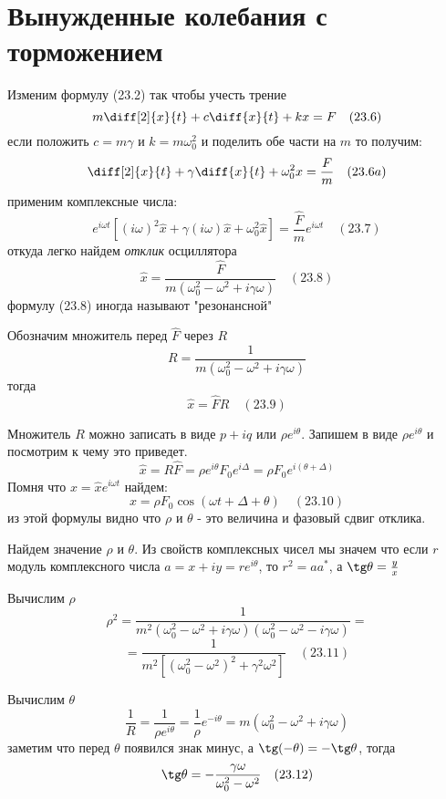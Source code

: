 \documentclass[12pt]{article}
\begin{document}
\newpage

\section{Вынужденные колебания с торможением}

Изменим формулу (23.2) так чтобы учесть трение
\[
    m \diff[2]{x}{t} + c \diff{x}{t} + kx = F \quad (23.6)
\]
если положить $c=m\gamma$ и $k=m\omega_0^2$ и поделить обе части на $m$ то получим:
\[
    \diff[2]{x}{t} + \gamma \diff{x}{t} + \omega_0^2 x = \frac{F}{m} \quad (23.6a)
\]
применим комплексные числа:
\[
    e^{i\omega t}[(i\omega)^2 \hat{x} + \gamma(i\omega)\hat{x} + \omega_0^2 \hat{x}] = \frac{\hat
    F}{m} e^{i\omega t} \quad (23.7)
\]
откуда легко найдем \textit{отклик} осциллятора
\[
    \hat{x}=\frac{\hat{F}}{m(\omega_0^2-\omega^2+i\gamma\omega)} \quad (23.8)    
\]
формулу (23.8) иногда называют "резонансной"

\medskip

Обозначим множитель перед \(\hat{F}\) через \(R\)
\[
    R=\frac{1}{m(\omega_0^2-\omega^2+i\gamma\omega)}
\]
тогда
\[
    \hat{x}=\hat{F}R \quad (23.9) 
\]

\medbreak

Множитель \(R\) можно записать в виде \(p+iq\) или \(\rho e^{i \theta}\). Запишем в виде \(\rho e^{i \theta}\) и посмотрим к чему это приведет.
\[
    \hat{x}=R\hat{F}=\rho e^{i\theta} F_0e^{i \Delta}=\rho F_0e^{i (\theta+\Delta)}
\]
Помня что \(x=\hat{x}e^{i \omega t}\) найдем:
\[
    x=\rho F_0 \cos(\omega t + \Delta + \theta) \quad (23.10)
\]
из этой формулы видно что \(\rho\) и \(\theta\) - это величина и фазовый сдвиг отклика.

\medbreak

Найдем значение \(\rho\) и \(\theta\). Из свойств комплексных чисел мы значем что если \(r\) модуль комплексного числа \(a=x+iy=r e^{i \theta}\), то \(r^2=aa^*\), а \(\tg \theta = \frac{y}{x} \)

Вычислим \(\rho\)
\[
    \rho^2 = \frac{1}{m^2(\omega_0^2-\omega^2+i\gamma\omega)(\omega_0^2-\omega^2-i\gamma\omega)} =
\]
\[
    = \frac{1}{m^2[(\omega_0^2-\omega^2)^2+\gamma^2\omega^2]} \quad (23.11)
\]

Вычислим \(\theta\)
\[
    \frac{1}{R} = \frac{1}{\rho e^{i \theta}} = \frac{1}{\rho}e^{- i \theta} = m(\omega_0^2-\omega^2+i\gamma\omega)
\]
заметим что перед \(\theta\) появился знак минус, а \( \tg (-\theta)=-\tg \theta \), тогда
\[
    \tg \theta = -\frac{\gamma\omega}{\omega_0^2-\omega^2} \quad (23.12)
\]
\end{document}
